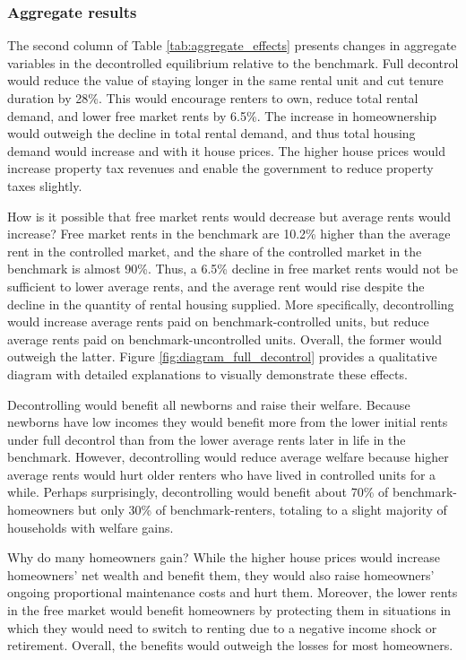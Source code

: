 \documentclass[parskip=full]{article}
\begin{document}
\subsubsection{Aggregate results} The second column of Table \ref{tab:aggregate_effects} presents changes in aggregate variables in the decontrolled equilibrium relative to the benchmark. Full decontrol would reduce the value of staying longer in the same rental unit and cut tenure duration by 28\%. This would encourage renters to own, reduce total rental demand, and lower free market rents by 6.5\%. The increase in homeownership would outweigh the decline in total rental demand, and thus total housing demand would increase and with it house prices. The higher house prices would increase property tax revenues and enable the government to reduce property taxes slightly.

How is it possible that free market rents would decrease but average rents would increase? Free market rents in the benchmark are 10.2\% higher than the average rent in the controlled market, and the share of the controlled market in the benchmark is almost 90\%. Thus, a 6.5\% decline in free market rents would not be sufficient to lower average rents, and the average rent would rise despite the decline in the quantity of rental housing supplied. More specifically, decontrolling would increase average rents paid on benchmark-controlled units, but reduce average rents paid on benchmark-uncontrolled units. Overall, the former would outweigh the latter. Figure \ref{fig:diagram_full_decontrol} provides a qualitative diagram with detailed explanations to visually demonstrate these effects.

Decontrolling would benefit all newborns and raise their welfare. Because newborns have low incomes they would benefit more from the lower initial rents under full decontrol than from the lower average rents later in life in the benchmark. However, decontrolling would reduce average welfare because higher average rents would hurt older renters who have lived in controlled units for a while. Perhaps surprisingly, decontrolling would benefit about 70\% of benchmark-homeowners but only 30\% of benchmark-renters, totaling to a slight majority of households with welfare gains. 

Why do many homeowners gain? While the higher house prices would increase homeowners' net wealth and benefit them, they would also raise homeowners' ongoing proportional maintenance costs and hurt them. Moreover, the lower rents in the free market would benefit homeowners by protecting them in situations in which they would need to switch to renting due to a negative income shock or retirement. Overall, the benefits would outweigh the losses for most homeowners.
\end{document}
